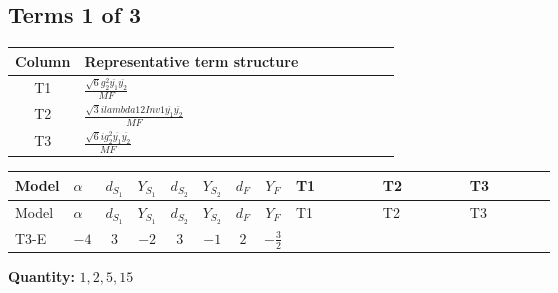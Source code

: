 \documentclass[8pt]{article}
\begin{document}
\begin{landscape}
\subsection*{Terms 1 of 3}
\begin{center}
\begin{tabular}{@{}c >{\raggedright\arraybackslash}p{0.82\linewidth}@{}}
\toprule
Column & Representative term structure \\
\midrule
T1 & \(\displaystyle \frac{\sqrt{6} g_{2}^{2} \overline{y_{1}} \overline{y_{2}}}{MF}\) \\
\midrule
T2 & \(\displaystyle \frac{\sqrt{3} i lambda12Inv1 \overline{y_{1}} \overline{y_{2}}}{MF}\) \\
\midrule
T3 & \(\displaystyle \frac{\sqrt{6} i g_{2}^{2} \overline{y_{1}} \overline{y_{2}}}{MF}\) \\
\midrule
\bottomrule
\end{tabular}
\end{center}
\smallskip
\tiny
\begin{longtable}{@{}llcccccc >{\raggedright\arraybackslash}p{0.21\linewidth} >{\raggedright\arraybackslash}p{0.21\linewidth} >{\raggedright\arraybackslash}p{0.21\linewidth}@{}}
\toprule
Model & $\alpha$ & $d_{S_1}$ & $Y_{S_1}$ & $d_{S_2}$ & $Y_{S_2}$ & $d_F$ & $Y_F$ & T1 & T2 & T3 \\
\midrule
\endfirsthead
\toprule
Model & $\alpha$ & $d_{S_1}$ & $Y_{S_1}$ & $d_{S_2}$ & $Y_{S_2}$ & $d_F$ & $Y_F$ & T1 & T2 & T3 \\
\midrule
\endhead
T3-E & $-4$ & $3$ & $-2$ & $3$ & $-1$ & $2$ & $-\frac{3}{2}$ & \scriptsize\adjustbox{max width=\linewidth}{$\begin{gathered} - \frac{\sqrt{6} g_{2}^{2} \overline{y_{1}} \overline{y_{2}}}{6 MF}\end{gathered}$} & \scriptsize\adjustbox{max width=\linewidth}{$\begin{gathered} - \frac{\sqrt{3} i lambda12Inv1 \overline{y_{1}} \overline{y_{2}}}{6 MF}\end{gathered}$} & \scriptsize\adjustbox{max width=\linewidth}{$\begin{gathered} \frac{\sqrt{6} i g_{2}^{2} \overline{y_{1}} \overline{y_{2}}}{6 MF}\end{gathered}$} \\
\midrule
\bottomrule
\end{longtable}
\clearpage
\noindent\textbf{Quantity: }$\mathrm{1,2,5,15}$\par\smallskip

\end{landscape}
\end{document}
